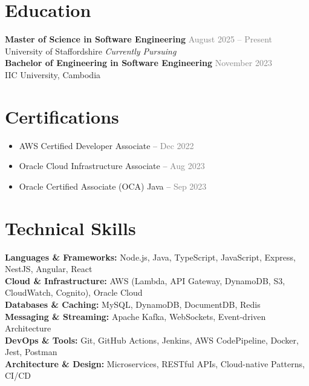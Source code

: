 \documentclass[11pt,a4paper]{article}
\begin{document}
\section*{Education}
\textbf{Master of Science in Software Engineering} \hfill \textcolor{graytext}{August 2025 -- Present} \\
University of Staffordshire \hfill \textit{Currently Pursuing} \\[6pt]
\textbf{Bachelor of Engineering in Software Engineering} \hfill \textcolor{graytext}{November 2023} \\
IIC University, Cambodia

\section*{Certifications}
\begin{itemize}[leftmargin=1.2em]
  \item AWS Certified Developer Associate – \textcolor{graytext}{Dec 2022}
  \item Oracle Cloud Infrastructure Associate – \textcolor{graytext}{Aug 2023}
  \item Oracle Certified Associate (OCA) Java – \textcolor{graytext}{Sep 2023}
\end{itemize}

\section*{Technical Skills}
\textbf{Languages \& Frameworks:} Node.js, Java, TypeScript, JavaScript, Express, NestJS, Angular, React \\
\textbf{Cloud \& Infrastructure:} AWS (Lambda, API Gateway, DynamoDB, S3, CloudWatch, Cognito), Oracle Cloud \\
\textbf{Databases \& Caching:} MySQL, DynamoDB, DocumentDB, Redis \\
\textbf{Messaging \& Streaming:} Apache Kafka, WebSockets, Event-driven Architecture \\
\textbf{DevOps \& Tools:} Git, GitHub Actions, Jenkins, AWS CodePipeline, Docker, Jest, Postman \\
\textbf{Architecture \& Design:} Microservices, RESTful APIs, Cloud-native Patterns, CI/CD

\end{document}
